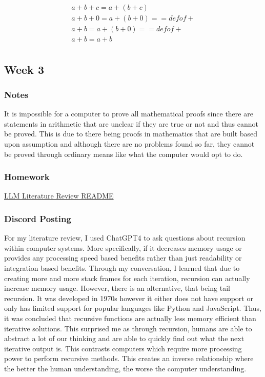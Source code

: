 \documentclass{article}
\theoremstyle{theorem}
\theoremstyle{definition}
\theoremstyle{remark}
\begin{document}
\begin{align*}
  a + b + c = a + (b + c) \\
  a + b + 0 = a + (b + 0) == def of + \\
  a + b = a + (b + 0) == def of + \\
  a + b = a + b \\
\end{align*}

\subsection{Week 3}

\subsubsection*{Notes}

It is impossible for a computer to prove all mathematical proofs since there are statements in arithmetic that are unclear if they are true or not and thus cannot be proved. This is due to there being proofs in mathematics that are built based upon assumption and although there are no problems found so far, they cannot be proved through ordinary means like what the computer would opt to do.

\subsubsection*{Homework}

\href{https://github.com/mrovengerdev/LLM-literature-review/blob/main/README.md}{LLM Literature Review README}

\subsubsection*{Discord Posting}

For my literature review, I used ChatGPT4 to ask questions about recursion within computer systems. More specifically, if it decreases memory usage or provides any processing speed based benefits rather than just readability or integration based benefits. Through my conversation, I learned that due to creating more and more stack frames for each iteration, recursion can actually increase memory usage. However, there is an alternative, that being tail recursion. It was developed in 1970s however it either does not have support or only has limited support for popular languages like Python and JavaScript. Thus, it was concluded that recursive functions are actually less memory efficient than iterative solutions. This surprised me as through recursion, humans are able to abstract a lot of our thinking and are able to quickly find out what the next iterative output is. This contrasts computers which require more processing power to perform recursive methods. This creates an inverse relationship where the better the human understanding, the worse the computer understanding.
\end{document}

